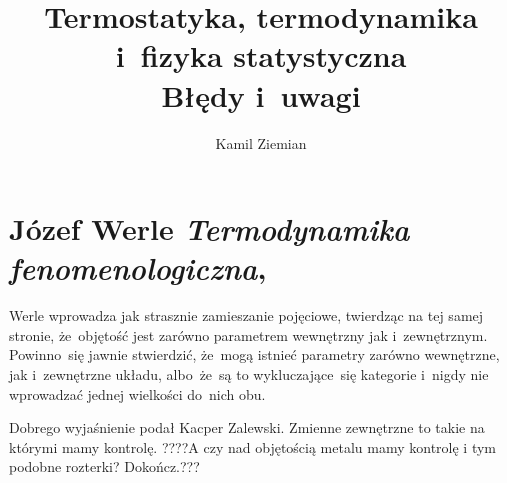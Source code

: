 \documentclass[a4paper,11pt]{article}
\title{Termostatyka, termodynamika i~fizyka statystyczna \\
  {\Large Błędy i~uwagi}}
\author{Kamil Ziemian}
\numberwithin{equation}{section}
\begin{document}





\maketitle









\section{Józef Werle \textit{Termodynamika fenomenologiczna},
  \cite{WerleTermodynamikaFenomenologiczna1957}}

\vspace{0em}



\vspace{0em}


\noindent
{} Werle wprowadza jak strasznie zamieszanie pojęciowe,
twierdząc na tej samej stronie, że~objętość jest zarówno parametrem
wewnętrzny jak i~zewnętrznym. Powinno~się jawnie stwierdzić, że~mogą
istnieć parametry zarówno wewnętrzne, jak i~zewnętrzne układu,
albo~że~są to wykluczające~się kategorie i~nigdy nie wprowadzać jednej
wielkości do~nich obu.

Dobrego wyjaśnienie podał Kacper Zalewski. Zmienne zewnętrzne to takie
na którymi mamy kontrolę. ????A czy nad objętością metalu mamy
  kontrolę i tym podobne rozterki? Dokończ.???

\VerSpaceFour



\noindent
{}





\noindent

\end{document}
